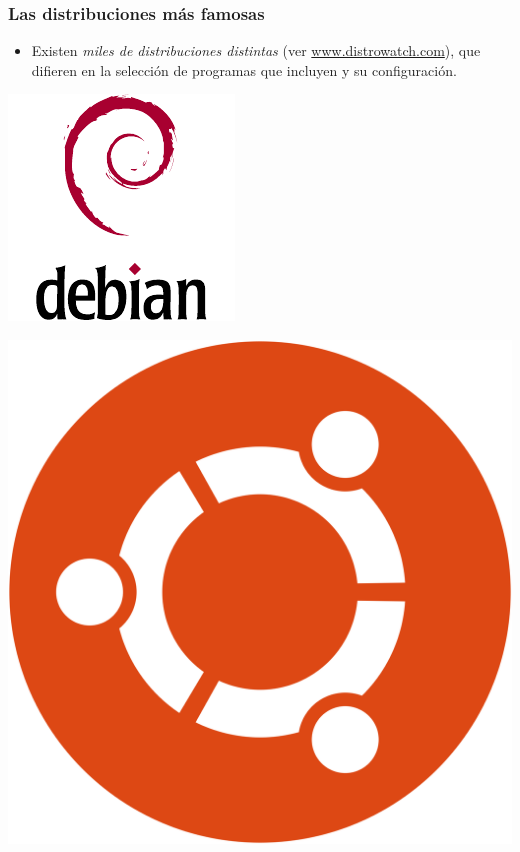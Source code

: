 \documentclass[hyperref={colorlinks}]{beamer}
\begin{document}
\begin{frame}
    \frametitle{Las distribuciones m\'as famosas}
    \begin{itemize}
    \item Existen \textit{miles de distribuciones distintas} (ver \url{www.distrowatch.com}), que difieren en la selecci\'on de programas que incluyen y su configuraci\'on.\\[0.5cm]
    \end{itemize}

    \begin{minipage}[b][.20\textheight][t]{.20\textwidth}
    \includegraphics[width=.7\textwidth]{figs/logo-debian.pdf}\\
    \end{minipage}\hfill
    \begin{minipage}[b][.20\textheight][t]{.20\textwidth}
    \includegraphics[width=.7\textwidth]{figs/logo-ubuntu.png}\\

\end{minipage}
\end{frame}
\end{document}
